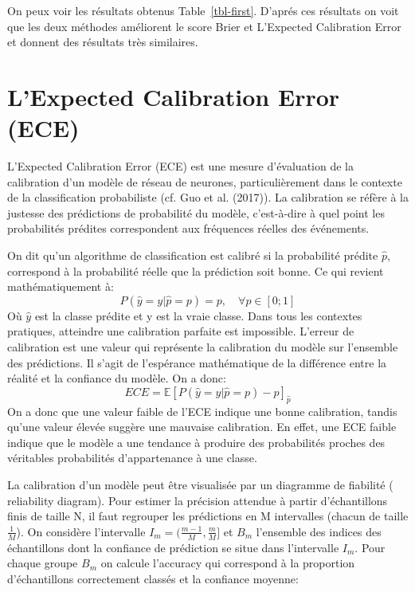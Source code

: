 \documentclass[
  letterpaper,
  DIV=11,
  numbers=noendperiod]{scrartcl}
\begin{document}
On peux voir les résultats obtenus Table~\ref{tbl-first}. D'aprés ces
résultats on voit que les deux méthodes améliorent le score Brier et
L'Expected Calibration Error et donnent des résultats très similaires.

\hypertarget{lexpected-calibration-error-ece}{%
\section{L'Expected Calibration Error
(ECE)}\label{lexpected-calibration-error-ece}}

L'Expected Calibration Error (ECE) est une mesure d'évaluation de la
calibration d'un modèle de réseau de neurones, particulièrement dans le
contexte de la classification probabiliste (cf. Guo et al. (2017)). La
calibration se réfère à la justesse des prédictions de probabilité du
modèle, c'est-à-dire à quel point les probabilités prédites
correspondent aux fréquences réelles des événements.

On dit qu'un algorithme de classification est calibré si la probabilité
prédite \(\hat{p}\), correspond à la probabilité réelle que la
prédiction soit bonne. Ce qui revient mathématiquement à: \[
P(\hat{y}=y|\hat{p}=p)=p, \quad \forall p\in [0;1]
\] Où \(\hat{y}\) est la classe prédite et y est la vraie classe. Dans
tous les contextes pratiques, atteindre une calibration parfaite est
impossible. L'erreur de calibration est une valeur qui représente la
calibration du modèle sur l'ensemble des prédictions. Il s'agit de
l'espérance mathématique de la différence entre la réalité et la
confiance du modèle. On a donc: \[
ECE=\mathbb{E}[P(\hat{y}=y|\hat{p}=p)-p]_{\hat{p}}
\] On a donc que une valeur faible de l'ECE indique une bonne
calibration, tandis qu'une valeur élevée suggère une mauvaise
calibration. En effet, une ECE faible indique que le modèle a une
tendance à produire des probabilités proches des véritables probabilités
d'appartenance à une classe.

La calibration d'un modèle peut être visualisée par un diagramme de
fiabilité ( reliability diagram). Pour estimer la précision attendue à
partir d'échantillons finis de taille N, il faut regrouper les
prédictions en M intervalles (chacun de taille \(\frac{1}{M}\)). On
considère l'intervalle \(I_m=(\frac{m-1}{M},\frac{m}{M}]\) et \(B_m\)
l'ensemble des indices des échantillons dont la confiance de prédiction
se situe dans l'intervalle \(I_m\). Pour chaque groupe \(B_m\) on
calcule l'accuracy qui correspond à la proportion d'échantillons
correctement classés et la confiance moyenne:
\end{document}
